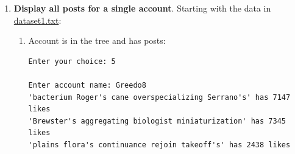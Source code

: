 \documentclass{assignment}
\begin{document}
\begin{enumerate}
\begin{enumerate}
\begin{center}
{\begin{BVerbatim}
Enter account name: KyleKatarn2
'KyleKatarn2' has successfully been deleted
\end{BVerbatim} 
\newpage
\begin{BVerbatim}
===============================
Choose an action from the menu:
===============================

1. Find the profile description for a given account
2. List all accounts
3. Create an account
4. Delete an account
5. Display all posts for a single account
6. Add a new post for an account
7. Load a file of actions from disk and process this
8. Sign into an account
9. Quit

Enter your choice: 2

USERNAME: Greedo8
DESCRIPTION: Kishinev drip's transcendentally
---------------------------------------------
USERNAME: GeneralVeers3
DESCRIPTION: Coulter's immaculately mill
----------------------------------------
USERNAME: UlicQel-Droma6
DESCRIPTION: broccoli's werewolf's gonads
-----------------------------------------
USERNAME: MaraJade7
DESCRIPTION: stud's nationalization's foxgloves
-----------------------------------------------
\end{BVerbatim}
}
\end{center} \color{black}
We see that after showing all accounts, 'KyleKatarn2' has been deleted
\item Item is not in the Tree:
        \begin{center}
\color{gray}
\small{
\begin{BVerbatim}
Enter your choice: 4

Enter account name: Greedo10
'Greedo10' does not exist
\end{BVerbatim}
}
\end{center} \color{black}
\end{enumerate}

\item \textbf{Display all posts for a single account}. Starting with the data in \underline{dataset1.txt}:
    \begin{enumerate}
        \item Account is in the tree and has posts:
        \begin{center} \small { \color{gray}
        \begin{BVerbatim} 
Enter your choice: 5

Enter account name: Greedo8
'bacterium Roger's cane overspecializing Serrano's' has 7147 likes
'Brewster's aggregating biologist miniaturization' has 7345 likes
'plains flora's continuance rejoin takeoff's' has 2438 likes
        \end{BVerbatim} 
        } \end{center} \color{black}
        

\end{enumerate}
\end{enumerate}
\end{document}
